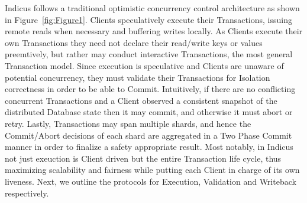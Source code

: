 Indicus follows a traditional optimistic concurrency control architecture as shown in Figure~\ref{fig:Figure1}. Clients speculatively execute their Transactions, issuing remote reads when necessary and buffering writes locally. As Clients execute their own Transactions they need not declare their read/write keys or values preemtively, but rather may conduct interactive Transactions, the most general Transaction model. Since execution is speculative and Clients are unaware of potential concurrency, they must validate their Transactions for Isolation correctness in order to be able to Commit. Intuitively, if there are no conflicting concurrent Transactions and a Client observed a consistent snapshot of the distributed Database state then it may commit, and otherwise it must abort or retry. Lastly, Transactions may span multiple shards, and hence the Commit/Abort decisions of each shard are aggregated in a Two Phase Commit manner in order to finalize a safety appropriate result. Most notably, in Indicus not just exeuction is Client driven but the entire Transaction life cycle, thus maximizing scalability and fairness while putting each Client in charge of its own liveness.
Next, we outline the protocols for Execution, Validation and Writeback respectively.

